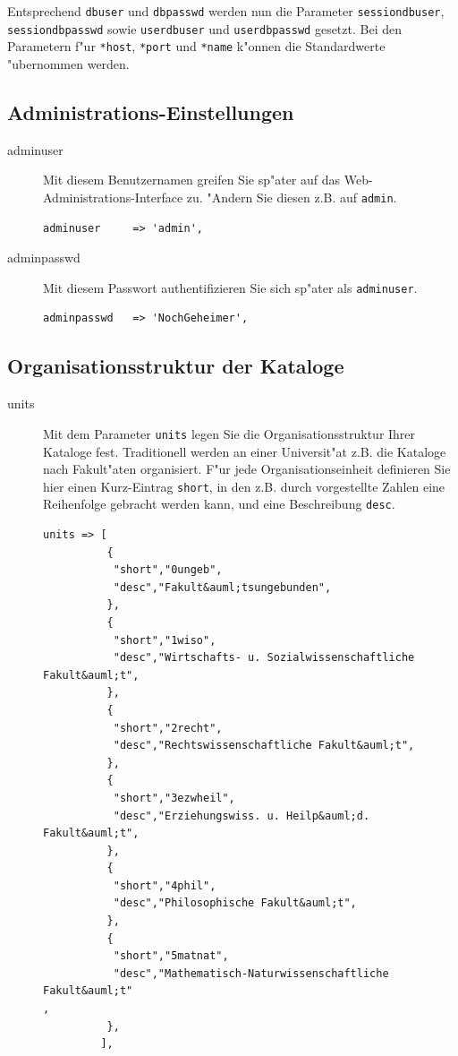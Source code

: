 \documentclass[11pt, twoside, a4paper, BCOR8mm, DIV12, bibtotoc,idxtotoc]{scrbook}
\begin{document}
Entsprechend \texttt{dbuser} und \texttt{dbpasswd} werden nun die
Parameter \texttt{sessiondbuser}, \texttt{sessiondbpasswd} sowie
\texttt{userdbuser} und \texttt{userdbpasswd} gesetzt. Bei den
Parametern f"ur \texttt{*host}, \texttt{*port} und \texttt{*name}
k"onnen die Standardwerte "ubernommen werden.



\subsection{Administrations-Einstellungen}

\begin{description}
\item[adminuser] Mit diesem Benutzernamen greifen Sie sp"ater auf das
  Web-Administrations-Interface zu. "Andern Sie diesen z.B. auf
  \texttt{admin}.
\begin{verbatim}
adminuser     => 'admin',
\end{verbatim}
\item[adminpasswd] Mit diesem Passwort authentifizieren Sie sich
  sp"ater als \texttt{adminuser}.
\begin{verbatim}
adminpasswd   => 'NochGeheimer',
\end{verbatim}
\end{description}


\subsection{Organisationsstruktur der Kataloge}

\begin{description}
\item[units] Mit dem Parameter \texttt{units} legen Sie die
  Organisationsstruktur Ihrer Kataloge fest. Traditionell werden an
  einer Universit"at z.B. die Kataloge nach Fakult"aten
  organisiert. F"ur jede Organisationseinheit definieren Sie hier
  einen Kurz-Eintrag \texttt{short}, in den z.B. durch vorgestellte
  Zahlen eine Reihenfolge gebracht werden kann, und eine Beschreibung
  \texttt{desc}. 
\begin{verbatim}
units => [
          {
           "short","0ungeb",
           "desc","Fakult&auml;tsungebunden",
          },
          {
           "short","1wiso",
           "desc","Wirtschafts- u. Sozialwissenschaftliche Fakult&auml;t",
          },
          {
           "short","2recht",
           "desc","Rechtswissenschaftliche Fakult&auml;t",
          },
          {
           "short","3ezwheil",
           "desc","Erziehungswiss. u. Heilp&auml;d. Fakult&auml;t",
          },
          {
           "short","4phil",
           "desc","Philosophische Fakult&auml;t",
          },
          {
           "short","5matnat",
           "desc","Mathematisch-Naturwissenschaftliche Fakult&auml;t"
,
          },
         ],
\end{verbatim}
\end{description}
\end{document}

